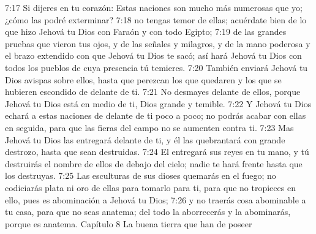 7:17 Si dijeres en tu corazón: Estas naciones son mucho más numerosas que yo; ¿cómo las podré exterminar?  
7:18 no tengas temor de ellas; acuérdate bien de lo que hizo Jehová tu Dios con Faraón y con todo Egipto;  
7:19 de las grandes pruebas que vieron tus ojos, y de las señales y milagros, y de la mano poderosa y el brazo extendido con que Jehová tu Dios te sacó; así hará Jehová tu Dios con todos los pueblos de cuya presencia tú temieres.  
7:20 También enviará Jehová tu Dios avispas sobre ellos, hasta que perezcan los que quedaren y los que se hubieren escondido de delante de ti.  
7:21 No desmayes delante de ellos, porque Jehová tu Dios está en medio de ti, Dios grande y temible.  
7:22 Y Jehová tu Dios echará a estas naciones de delante de ti poco a poco; no podrás acabar con ellas en seguida, para que las fieras del campo no se aumenten contra ti.  
7:23 Mas Jehová tu Dios las entregará delante de ti, y él las quebrantará con grande destrozo, hasta que sean destruidas.  
7:24 El entregará sus reyes en tu mano, y tú destruirás el nombre de ellos de debajo del cielo; nadie te hará frente hasta que los destruyas.  
7:25 Las esculturas de sus dioses quemarás en el fuego; no codiciarás plata ni oro de ellas para tomarlo para ti, para que no tropieces en ello, pues es abominación a Jehová tu Dios;  
7:26 y no traerás cosa abominable a tu casa, para que no seas anatema; del todo la aborrecerás y la abominarás, porque es anatema.  
Capítulo 8 
La buena tierra que han de poseer  

